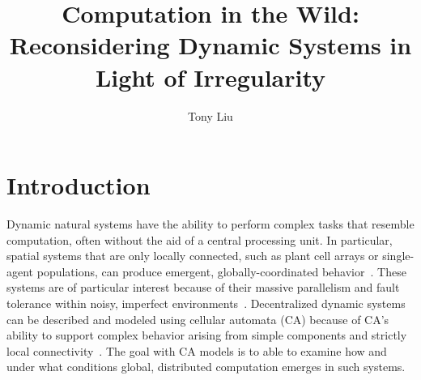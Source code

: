 \documentclass[a4paper,11pt]{report}
\begin{document}
\title{Computation in the Wild: Reconsidering Dynamic Systems in Light of Irregularity}

\author{Tony Liu}
\maketitle
\listoffigures



\chapter{Introduction}
\label{ch:Intro}
Dynamic natural systems have the ability to perform complex tasks that resemble computation, often without the aid of a central processing unit. In particular, spatial systems that are only locally connected, such as plant cell arrays or single-agent populations, can produce emergent, globally-coordinated behavior~\cite{bi07, mo07}. These systems are of particular interest because of their massive parallelism and fault tolerance within noisy, imperfect environments~\cite{si99}. Decentralized dynamic systems can be described and modeled using cellular automata (CA) because of CA's ability to support complex behavior arising from simple components and strictly local connectivity~\cite{mi96}. The goal with CA models is to able to examine how and under what conditions global, distributed computation emerges in such systems.
\end{document}
